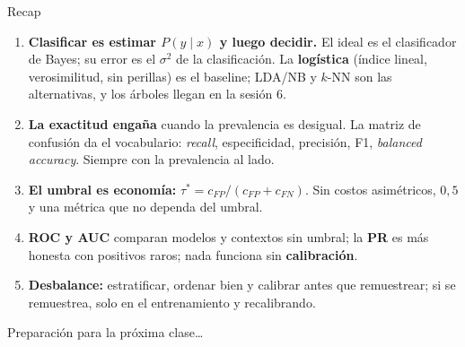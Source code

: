 \documentclass{beamer}
\newcommand{\1}{\mathbb{I}}
\begin{document}
\begin{frame}{Recap}
\small
\begin{enumerate}\itemsep6pt
  \item \textbf{Clasificar es estimar $P(y \mid x)$ y luego decidir.} El ideal es el clasificador de Bayes; su error es el $\sigma^2$ de la clasificación. La \textbf{logística} (índice lineal, verosimilitud, sin perillas) es el baseline; LDA/NB y $k$-NN son las alternativas, y los árboles llegan en la sesión 6.
  \item \textbf{La exactitud engaña} cuando la prevalencia es desigual. La matriz de confusión da el vocabulario: \emph{recall}, especificidad, precisión, F1, \emph{balanced accuracy}. Siempre con la prevalencia al lado.
  \item \textbf{El umbral es economía:} $\tau^* = c_{FP}/(c_{FP} + c_{FN})$. Sin costos asimétricos, $0{,}5$ y una métrica que no dependa del umbral.
  \item \textbf{ROC y AUC} comparan modelos y contextos sin umbral; la \textbf{PR} es más honesta con positivos raros; nada funciona sin \textbf{calibración}.
  \item \textbf{Desbalance:} estratificar, ordenar bien y calibrar antes que remuestrear; si se remuestrea, solo en el entrenamiento y recalibrando.
\end{enumerate}
\end{frame}

\begin{frame}
\vspace{2.0cm}
\Large{Preparación para la próxima clase\ldots}
\end{frame}

\end{document}
